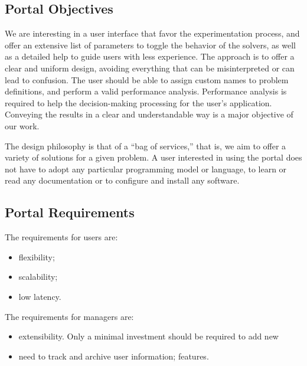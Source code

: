 \documentclass[11pt,relax]{SANDreport}
\begin{document}
\subsection{Portal Objectives}

We are interesting in a user interface that favor the
experimentation process, and offer an extensive list of parameters to toggle
the behavior of the solvers, as well as a detailed help to guide users with
less experience. The approach is to offer a clear and uniform design, avoiding
everything that can be misinterpreted or can lead to confusion. The user
should be able to assign custom names to problem definitions, and perform 
a valid performance analysis. Performance analysis is required to help the 
decision-making processing for the user's application.  Conveying the
results in a clear and understandable way is a major objective of our work.

The design philosophy is that of a ``bag of services,'' that is, we aim to
offer a variety of solutions for a given problem. A user interested in using
the portal does not have to adopt any particular programming model or
language, to learn or read any documentation or to configure and install any
software.

\subsection{Portal Requirements}

The requirements for users are:
\begin{itemize}
\setlength{\itemsep}{0pt}
\item flexibility;
\item scalability;
\item low latency.
\end{itemize}
The requirements for managers are:
\begin{itemize}
\setlength{\itemsep}{0pt}
\item extensibility. Only a minimal investment should be required to add new
\item need to track and archive user information;
features.
\end{itemize}

\end{document}
